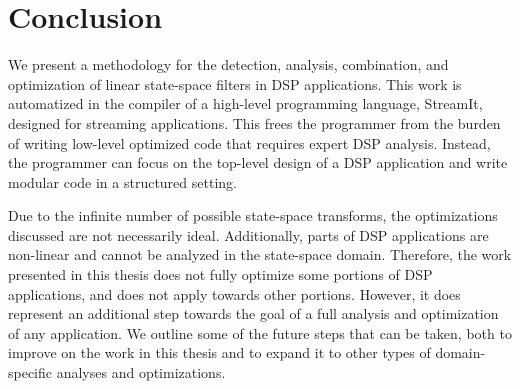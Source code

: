 \chapter{Conclusion}

    We present a methodology for the detection, analysis, combination, and
optimization of linear state-space filters in DSP applications.
This work is automatized in the compiler of a high-level
programming language, StreamIt, designed for streaming
applications. This frees the programmer from the burden of writing
low-level optimized code that requires expert DSP analysis.
Instead, the programmer can focus on the top-level design of a DSP
application and write modular code in a structured setting.

    Due to the infinite number of possible state-space transforms,
the optimizations discussed are not necessarily ideal.
Additionally, parts of DSP applications are non-linear and cannot
be analyzed in the state-space domain. Therefore, the work
presented in this thesis does not fully optimize some portions of
DSP applications, and does not apply towards other portions.
However, it does represent an additional step towards the goal of
a full analysis and optimization of any application. We outline
some of the future steps that can be taken, both to improve on the
work in this thesis and to expand it to other types of
domain-specific analyses and optimizations.
